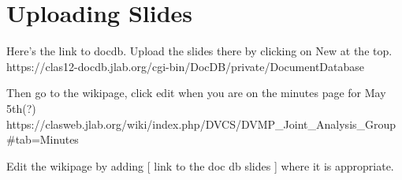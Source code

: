 \section{Uploading Slides}
Here's the link to docdb. Upload the slides there by clicking on New at the top.
https://clas12-docdb.jlab.org/cgi-bin/DocDB/private/DocumentDatabase

Then go to the wikipage, click edit when you are on the minutes page for May 5th(?)
https://clasweb.jlab.org/wiki/index.php/DVCS/DVMP_Joint_Analysis_Group#tab=Minutes

Edit the wikipage by adding
[ link to the doc db slides ]
where it is appropriate.

